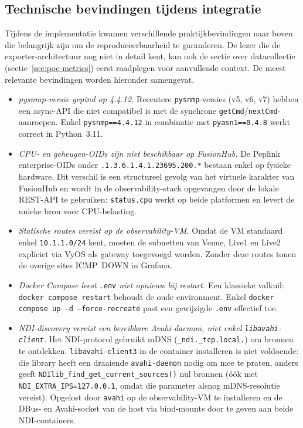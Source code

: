 \subsection{Technische bevindingen tijdens integratie}

Tijdens de implementatie kwamen verschillende praktijkbevindingen naar boven die belangrijk zijn om de reproduceerbaarheid te garanderen. De lezer die de exporter-architectuur nog niet in detail kent, kan ook de sectie over datacollectie (sectie~\ref{sec:poc-metrics}) eerst raadplegen voor aanvullende context. De meest relevante bevindingen worden hieronder samengevat.

\begin{itemize}
  \item \emph{pysnmp-versie gepind op 4.4.12.} Recentere \texttt{pysnmp}-versies (v5, v6, v7) hebben een async-API die niet compatibel is met de synchrone \texttt{getCmd}/\texttt{nextCmd}-aanroepen. Enkel \texttt{pysnmp==4.4.12} in combinatie met \texttt{pyasn1==0.4.8} werkt correct in Python~3.11.
  \item \emph{CPU- en geheugen-OIDs zijn niet beschikbaar op FusionHub.} De Peplink enterprise-OIDs onder \texttt{.1.3.6.1.4.1.23695.200.*} bestaan enkel op fysieke hardware. Dit verschil is een structureel gevolg van het virtuele karakter van FusionHub en wordt in de observability-stack opgevangen door de lokale REST-API te gebruiken: \texttt{status.cpu} werkt op beide platformen en levert de unieke bron voor CPU-belasting.
  \item \emph{Statische routes vereist op de observability-VM.} Omdat de VM standaard enkel \texttt{10.1.1.0/24} kent, moeten de subnetten van Venue, Live1 en Live2 expliciet via VyOS als gateway toegevoegd worden. Zonder deze routes tonen de overige sites ICMP~DOWN in Grafana.
  \item \emph{Docker Compose leest \texttt{.env} niet opnieuw bij restart.} Een klassieke valkuil: \texttt{docker compose restart} behoudt de oude environment. Enkel \texttt{docker compose up -d --force-recreate} past een gewijzigde \texttt{.env} effectief toe.
  \item \emph{NDI-discovery vereist een bereikbare Avahi-daemon, niet enkel \texttt{libavahi-client}.} Het NDI-protocol gebruikt mDNS (\texttt{\_ndi.\_tcp.local.}) om bronnen te ontdekken. \texttt{libavahi-client3} in de container installeren is niet voldoende: die library heeft een draaiende \texttt{avahi-daemon} nodig om mee te praten, anders geeft \texttt{NDIlib\_find\_get\_current\_sources()} nul bronnen (óók met \texttt{NDI\_EXTRA\_IPS=127.0.0.1}, omdat die parameter alsnog mDNS-resolutie vereist). Opgelost door \texttt{avahi} op de observability-VM te installeren en de DBus- en Avahi-socket van de host via bind-mounts door te geven aan beide NDI-containers.

\end{itemize}
